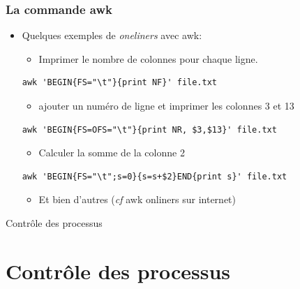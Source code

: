 \documentclass[10pt, xcolor=dvipsnames]{beamer}
\begin{document}
\begin{frame}[fragile]
  \frametitle{La commande awk}

  \begin{itemize}
  \item Quelques exemples de \textit{oneliners} avec awk:

    \begin{itemize}
    \item Imprimer le nombre de colonnes pour chaque ligne.
    \end{itemize}
\begin{verbatim}
awk 'BEGIN{FS="\t"}{print NF}' file.txt
\end{verbatim}

\begin{itemize}
\item ajouter un numéro de ligne et imprimer les colonnes 3 et 13
\end{itemize}
\begin{verbatim}
awk 'BEGIN{FS=OFS="\t"}{print NR, $3,$13}' file.txt
\end{verbatim}

\begin{itemize}
\item Calculer la somme de la colonne 2
\end{itemize}
\begin{verbatim}
awk 'BEGIN{FS="\t";s=0}{s=s+$2}END{print s}' file.txt
\end{verbatim}
\begin{itemize}
\item Et bien d'autres (\textit{cf} awk onliners sur internet) 
\end{itemize}



  \end{itemize}

\end{frame}



\frame
{
\begin{block}{}
\begin{center}
\begin{huge}
Contrôle des processus
\end{huge}
\end{center}
\end{block}
}



\section{Contrôle des processus}
\end{document}
